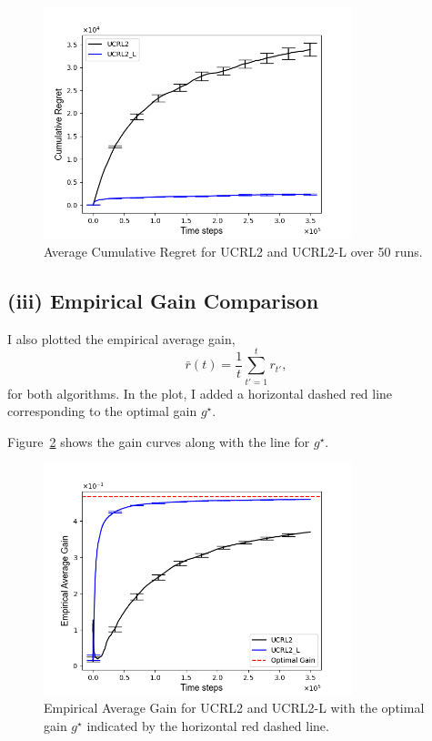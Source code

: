 \begin{figure}[H]
  \centering
  \includegraphics[width=0.8\textwidth]{Code/3/Figure_UCRL2_UCRL2_L_cumulative_regret_comparison.png}
  \caption{Average Cumulative Regret for UCRL2 and UCRL2-L over 50 runs.}
  \label{fig:cum_regret}
\end{figure}

\subsection*{(iii) Empirical Gain Comparison}
I also plotted the empirical average gain,
\[
\bar{r}(t)= \frac{1}{t}\sum_{t'=1}^{t} r_{t'},
\]
for both algorithms. In the plot, I added a horizontal dashed red line corresponding to the optimal gain \( g^{\star} \).

Figure~\ref{fig:gain} shows the gain curves along with the line for \( g^{\star} \).

\begin{figure}[H]
  \centering
  \includegraphics[width=0.8\textwidth]{Code/3/Figure_UCRL2_UCRL2_L_gain_comparison.png}
  \caption{Empirical Average Gain for UCRL2 and UCRL2-L with the optimal gain \( g^{\star} \) indicated by the horizontal red dashed line.}
  \label{fig:gain}
\end{figure}


